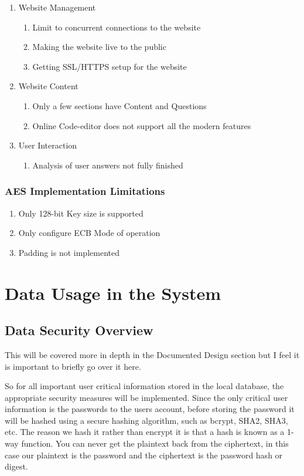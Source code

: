 \begin{enumerate}
\item{
Website Management
	\begin{enumerate}
		\item{Limit to concurrent connections to the website}
		\item{Making the website live to the public}
		\item{Getting SSL/HTTPS setup for the website}
	\end{enumerate}
}
\item{
Website Content
	\begin{enumerate}
        \item{Only a few sections have Content and Questions}
		\item{Online Code-editor does not support all the modern features}
	\end{enumerate}
}
\item{
User Interaction
	\begin{enumerate}
		\item{Analysis of user answers not fully finished}
	\end{enumerate}
}
\end{enumerate}

\subsubsection{AES Implementation Limitations}
\begin{enumerate}
\item{Only 128-bit Key size is supported}
\item{Only configure ECB Mode of operation}
\item{Padding is not implemented}
\end{enumerate}

\section{Data Usage in the System}

\subsection{Data Security Overview}
This will be covered more in depth in the Documented Design section but I feel it is important to briefly go over it here.

So for all important user critical information stored in the local database, the appropriate security measures will be implemented. Since the only critical user information is the passwords to the users account, before storing the password it will be hashed using a secure hashing algorithm, such as bcrypt, SHA2, SHA3, etc. The reason we hash it rather than encrypt it is that a hash is known as a 1-way function. You can never get the plaintext back from the ciphertext, in this case our plaintext is the password and the ciphertext is the password hash or digest. 

